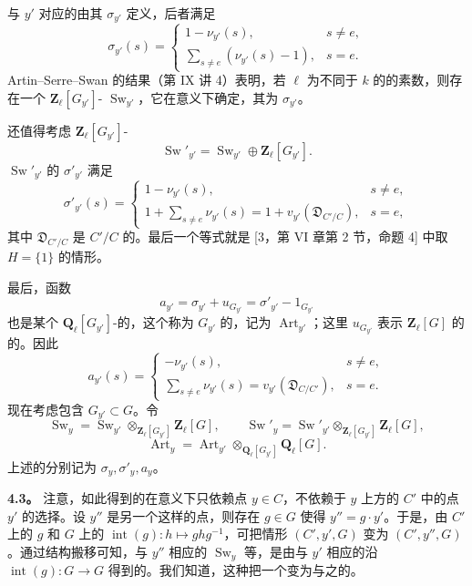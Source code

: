 与 $y'$ 对应的由其 $\sigma_{y'}$ 定义，后者满足
\[
\sigma_{y'}(s)=
\begin{cases}
1-\nu_{y'}(s),&s\ne e,\\
\displaystyle\sum_{s\ne e}(\nu_{y'}(s)-1),&s=e.
\end{cases}\tag{4.2.2}
\]
Artin--Serre--Swan 的结果（第 IX 讲 4）表明，若 $\ell$ 为不同于 $k$ 的的素数，则存在一个 $\mathbf Z_\ell[G_{y'}]$- $\operatorname{Sw}_{y'}$，它在意义下确定，其为 $\sigma_{y'}$。

还值得考虑 $\mathbf Z_\ell[G_{y'}]$-
\[
\operatorname{Sw}'_{y'}=\operatorname{Sw}_{y'}\oplus\mathbf Z_\ell[G_{y'}].\tag{4.2.3}
\]
$\operatorname{Sw}'_{y'}$ 的 $\sigma'_{y'}$ 满足
\[
\sigma'_{y'}(s)=
\begin{cases}
1-\nu_{y'}(s),&s\ne e,\\
\displaystyle1+\sum_{s\ne e}\nu_{y'}(s)=1+v_{y'}(\mathfrak D_{C'/C}),&s=e,
\end{cases}\tag{4.2.4}
\]
其中 $\mathfrak D_{C'/C}$ 是 $C'/C$ 的。最后一个等式就是 [3，第 VI 章第 2 节，命题 4] 中取 $H=\{1\}$ 的情形。

最后，函数
\[
a_{y'}=\sigma_{y'}+u_{G_{y'}}=\sigma'_{y'}-1_{G_{y'}}\tag{4.2.5}
\]
也是某个 $\mathbf Q_\ell[G_{y'}]$-的，这个称为 $G_{y'}$ 的，记为 $\operatorname{Art}_{y'}$；这里 $u_{G_{y'}}$ 表示 $\mathbf Z_\ell[G]$ 的的。因此
\[
a_{y'}(s)=
\begin{cases}
-\nu_{y'}(s),&s\ne e,\\
\displaystyle\sum_{s\ne e}\nu_{y'}(s)=v_{y'}(\mathfrak D_{C/C'}),&s=e.
\end{cases}\tag{4.2.6}
\]
现在考虑包含 $G_{y'}\subset G$。令
\[
\operatorname{Sw}_y=\operatorname{Sw}_{y'}\otimes_{\mathbf Z_\ell[G_{y'}]}\mathbf Z_\ell[G],\qquad
\operatorname{Sw}'_y=\operatorname{Sw}'_{y'}\otimes_{\mathbf Z_\ell[G_{y'}]}\mathbf Z_\ell[G],\tag{4.2.7}
\]
\[
\operatorname{Art}_y=\operatorname{Art}_{y'}\otimes_{\mathbf Q_\ell[G_{y'}]}\mathbf Q_\ell[G].\tag{4.2.8}
\]
上述的分别记为 $\sigma_y,\sigma'_y,a_y$。

\textbf{4.3。} 注意，如此得到的在意义下只依赖点 $y\in C$，不依赖于 $y$ 上方的 $C'$ 中的点 $y'$ 的选择。设 $y''$ 是另一个这样的点，则存在 $g\in G$ 使得 $y''=g\cdot y'$。于是，由 $C'$ 上的 $g$ 和 $G$ 上的 $\operatorname{int}(g):h\longmapsto ghg^{-1}$，可把情形 $(C',y',G)$ 变为 $(C',y'',G)$。通过结构搬移可知，与 $y''$ 相应的 $\operatorname{Sw}_y$ 等，是由与 $y'$ 相应的沿 $\operatorname{int}(g):G\longrightarrow G$ 得到的。我们知道，这种把一个变为与之的。

